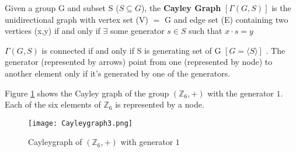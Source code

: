\begin{definition}
    Given a group  G and subset S ($S\subseteq G$), the \textbf{Cayley Graph} $[\Gamma(G,S)]$ is the unidirectional graph with vertex set (V) $=$ G and edge set (E) containing two vertices (x,y) if and only if $\exists$ some generator $s \in S$ such that $\boxed{x\cdot s=y}$
\end{definition}

\begin{note}
    $\Gamma(G,S)$ is connected if and only if S is generating set of G $[G = \langle S \rangle]$
. The generator (represented by arrows) point from one (represented by node) to another element only if it's generated by one of the generators. 
\end{note}

\begin{example}

Figure \ref{Figure_Cayleygraph} shows the Cayley graph of the group $(\mathbb{Z}_{6}, +)$ with the generator $1$. Each of the six elements of $\mathbb{Z}_6$ is represented by a node.

\begin{figure}[H]
\centering
\texttt{[image: Cayleygraph3.png]}
\caption{Cayleygraph of $(\mathbb{Z}_ 6, +)$ with generator $1$}
\label{Figure_Cayleygraph}
\end{figure}
\end{example}

